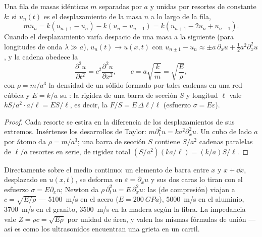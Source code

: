 \begin{proposition}\label{prop:b2:waves-on-strings:chain}
Una fila de masas idénticas $m$ separadas por $a$ y unidas por resortes de
constante $k$: si $u_n(t)$ es el desplazamiento de la masa $n$ a lo largo
de la fila,
\[
m\ddot u_n = k(u_{n+1} - u_n) - k(u_n - u_{n-1}) = k(u_{n+1} - 2u_n + u_{n-1}) .
\]
Cuando el desplazamiento varía despacio de una masa a la siguiente (para
longitudes de onda $\lambda \gg a$), $u_n(t) \to u(x, t)$ con $u_{n\pm1} - u_n \approx
\pm a\,\partial_xu + \tfrac12a^2\partial_x^2u$, y la cadena obedece la 
\[
\frac{\partial^2u}{\partial t^2} = c^2\frac{\partial^2u}{\partial x^2} , \qquad
c = a\sqrt{\frac km} = \sqrt{\frac{E}{\rho}} ,
\]
con $\rho = m/a^3$ la densidad de un sólido formado por tales cadenas en
una red cúbica y $E = k/a$ su \emph{}: la rigidez de una
barra de sección $S$ y longitud $\ell$ vale $kS/a^2\cdot a/\ell = ES/\ell$,
es decir, la \emph{} $F/S = E\,\Delta\ell/\ell$ (esfuerzo $\sigma = E\varepsilon$).
\end{proposition}

\begin{proof}
Cada resorte se estira en la diferencia de los desplazamientos de sus
extremos. Insértense los desarrollos de Taylor: $m\partial_t^2u = ka^2\partial_x^2u$. Un cubo de
lado $a$ por átomo da $\rho = m/a^3$; una barra de sección $S$ contiene
$S/a^2$ cadenas paralelas de $\ell/a$ resortes en serie, de rigidez total
$(S/a^2)(ka/\ell) = (k/a)S/\ell$.
\end{proof}

\begin{proposition}\label{prop:b2:waves-on-strings:rod}
Directamente sobre el medio continuo: un elemento de barra entre $x$ y $x +
\dd x$, desplazado en $u(x, t)$, se deforma en $\varepsilon = \partial_xu$ y sus
dos caras lo tiran con el esfuerzo $\sigma = E\partial_xu$; Newton da $\rho\,\partial_t^2u =
E\,\partial_x^2u$: las  (de compresión) viajan a $c = \sqrt{E/\rho}$
--- \qty{5100}{m/s} en el acero ($E = \qty{200}{GPa}$), \qty{5000}{m/s} en el aluminio,
\qty{3700}{m/s} en el granito, \qty{3500}{m/s} en la madera según la fibra. La
impedancia vale $Z = \rho c = \sqrt{E\rho}$ por unidad de área, y valen las
mismas fórmulas de unión --- así es como los ultrasonidos encuentran una
grieta en un carril.
\end{proposition}

